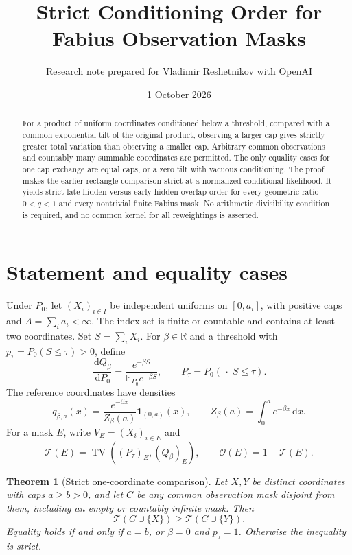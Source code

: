 \documentclass[11pt,a4paper]{article}
\title{Strict Conditioning Order for Fabius Observation Masks}
\author{Research note prepared for Vladimir Reshetnikov with OpenAI}
\date{1 October 2026}
\newtheorem{theorem}{Theorem}[section]\newtheorem{lemma}[theorem]{Lemma}
\theoremstyle{remark}\newtheorem*{ednote}{Editorial note (ProveIt, 2026-10-01)}
\newcommand{\E}{\mathbb E}\newcommand{\R}{\mathbb R}
\newcommand{\TV}{\operatorname{TV}}\newcommand{\ind}{\mathbf1}\newcommand{\dd}{\,\mathrm d}
\begin{document}
\maketitle
\begin{abstract}
For a product of uniform coordinates conditioned below a threshold, compared with a common exponential tilt of the original product, observing a larger cap gives strictly greater total variation than observing a smaller cap. Arbitrary common observations and countably many summable coordinates are permitted. The only equality cases for one cap exchange are equal caps, or a zero tilt with vacuous conditioning. The proof makes the earlier rectangle comparison strict at a normalized conditional likelihood. It yields strict late-hidden versus early-hidden overlap order for every geometric ratio $0<q<1$ and every nontrivial finite Fabius mask. No arithmetic divisibility condition is required, and no common kernel for all reweightings is asserted.
\end{abstract}

\section{Statement and equality cases}
Under $P_0$, let $(X_i)_{i\in I}$ be independent uniforms on $[0,a_i]$, with positive caps and $A=\sum_i a_i<\infty$. The index set is finite or countable and contains at least two coordinates. Set $S=\sum_iX_i$. For $\beta\in\R$ and a threshold with $p_\tau=P_0(S\le\tau)>0$, define
\begin{equation}\label{eq:model}
 \frac{\dd Q_\beta}{\dd P_0}
 =\frac{e^{-\beta S}}{\E_{P_0}e^{-\beta S}},
 \qquad P_\tau=P_0(\,\cdot\mid S\le\tau).
\end{equation}
The reference coordinates have densities
\[
 q_{\beta,a}(x)=\frac{e^{-\beta x}}{Z_\beta(a)}\ind_{(0,a)}(x),
 \qquad Z_\beta(a)=\int_0^a e^{-\beta x}\dd x.
\]
For a mask $E$, write $V_E=(X_i)_{i\in E}$ and
\[
 \mathcal T(E)=\TV((P_\tau)_E,(Q_\beta)_E),
 \qquad \mathcal O(E)=1-\mathcal T(E).
\]

\begin{theorem}[Strict one-coordinate comparison]\label{thm:exchange}
Let $X,Y$ be distinct coordinates with caps $a\ge b>0$, and let $C$ be any common observation mask disjoint from them, including an empty or countably infinite mask. Then
\begin{equation}\label{eq:strict}
 \mathcal T(C\cup\{X\})\ge\mathcal T(C\cup\{Y\}).
\end{equation}
Equality holds if and only if $a=b$, or $\beta=0$ and $p_\tau=1$. Otherwise the inequality is strict.
\end{theorem}
\end{document}
